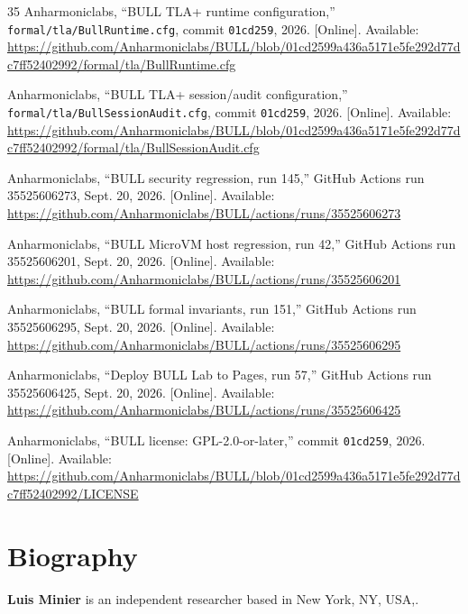 \documentclass[journal]{IEEEtran}
\begin{document}
\begin{thebibliography}{35}
Anharmoniclabs, ``BULL TLA+ runtime configuration,'' \texttt{formal/tla/BullRuntime.cfg}, commit \texttt{01cd259}, 2026. [Online]. Available: \url{https://github.com/Anharmoniclabs/BULL/blob/01cd2599a436a5171e5fe292d77dc7ff52402992/formal/tla/BullRuntime.cfg}

Anharmoniclabs, ``BULL TLA+ session/audit configuration,'' \texttt{formal/tla/BullSessionAudit.cfg}, commit \texttt{01cd259}, 2026. [Online]. Available: \url{https://github.com/Anharmoniclabs/BULL/blob/01cd2599a436a5171e5fe292d77dc7ff52402992/formal/tla/BullSessionAudit.cfg}

Anharmoniclabs, ``BULL security regression, run 145,'' GitHub Actions run 35525606273, Sept. 20, 2026. [Online]. Available: \url{https://github.com/Anharmoniclabs/BULL/actions/runs/35525606273}

Anharmoniclabs, ``BULL MicroVM host regression, run 42,'' GitHub Actions run 35525606201, Sept. 20, 2026. [Online]. Available: \url{https://github.com/Anharmoniclabs/BULL/actions/runs/35525606201}

Anharmoniclabs, ``BULL formal invariants, run 151,'' GitHub Actions run 35525606295, Sept. 20, 2026. [Online]. Available: \url{https://github.com/Anharmoniclabs/BULL/actions/runs/35525606295}

Anharmoniclabs, ``Deploy BULL Lab to Pages, run 57,'' GitHub Actions run 35525606425, Sept. 20, 2026. [Online]. Available: \url{https://github.com/Anharmoniclabs/BULL/actions/runs/35525606425}

Anharmoniclabs, ``BULL license: GPL-2.0-or-later,'' commit \texttt{01cd259}, 2026. [Online]. Available: \url{https://github.com/Anharmoniclabs/BULL/blob/01cd2599a436a5171e5fe292d77dc7ff52402992/LICENSE}

\end{thebibliography}

\section*{Biography}
\begingroup\footnotesize
\noindent\textbf{Luis Minier} is an independent researcher based in New York, NY, USA,.\par
\endgroup
\end{document}
